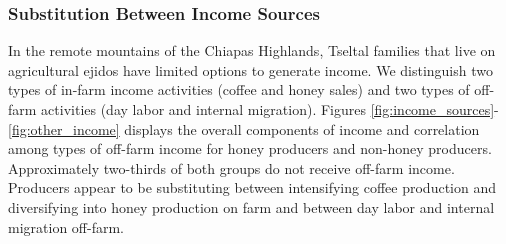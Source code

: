 \documentclass[../main.tex]{subfiles}
\begin{document}
\subsubsection{Substitution Between Income Sources}

In the remote mountains of the Chiapas Highlands, Tseltal families that live on agricultural ejidos have limited options to generate income.  We distinguish two types of in-farm income activities (coffee and honey sales) and two types of off-farm activities (day labor and internal migration). Figures \ref{fig:income_sources}-\ref{fig:other_income} displays the overall components of income and correlation among types of off-farm income for honey producers and non-honey producers. Approximately two-thirds of both groups do not receive off-farm income. Producers appear to be substituting between intensifying coffee production and diversifying into honey production on farm and between day labor and internal migration off-farm.
\end{document}
